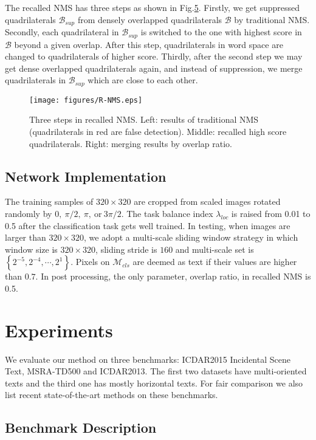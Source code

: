 \documentclass[10pt,twocolumn,letterpaper]{article}
\begin{document}
	The recalled NMS has three steps as shown in Fig.\hyperref[Fig.5]{5}. Firstly, we get suppressed quadrilaterals $\mathcal{B}_{sup}$ from densely overlapped quadrilaterals $\mathcal{B}$ by traditional NMS. Secondly, each quadrilateral in $\mathcal{B}_{sup}$ is switched to the one with highest score in $\mathcal{B}$ beyond a given overlap. After this step, quadrilaterals in word space are changed to quadrilaterals of higher score. Thirdly, after the second step we may get dense overlapped quadrilaterals again, and instead of suppression, we merge quadrilaterals in $\mathcal{B}_{sup}$ which are close to each other.
	
	\begin{figure}
		\label{Fig.5}
		\centering
		\texttt{[image: figures/R-NMS.eps]}
		\caption{Three steps in recalled NMS. Left: results of traditional NMS (quadrilaterals in red are false detection). Middle: recalled high score quadrilaterals. Right: merging results by overlap ratio.}
	\end{figure}	
	
	\subsection{Network Implementation}
	\label{Sec.3.4}
	The training samples of $320 \times 320$ are cropped from scaled images rotated randomly by $0, \ {\pi}/{2}, \ \pi, \ \text{or} \ {3\pi}/{2}$. The task balance index $\lambda_{loc}$ is raised from 0.01 to 0.5 after the classification task gets well trained. In testing, when images are larger than $320 \times 320$, we adopt a multi-scale sliding window strategy in which window size is $320 \times 320$, sliding stride is $160$ and multi-scale set is $\left\{2^{-5}, 2^{-4}, \cdots, 2^{1}\right\}$. Pixels on $\mathcal{M}_{cls}$ are deemed as text if their values are higher than $0.7$. In post processing, the only parameter, overlap ratio, in recalled NMS is 0.5.


\section{Experiments}
	\label{Sec.4}
	We evaluate our method on three benchmarks: ICDAR2015 Incidental Scene Text, MSRA-TD500 and ICDAR2013. The first two datasets have multi-oriented texts and the third one has mostly horizontal texts. For fair comparison we also list recent state-of-the-art methods on these benchmarks.

	\subsection{Benchmark Description}
	\label{Sec.4.1}
	
\end{document}
